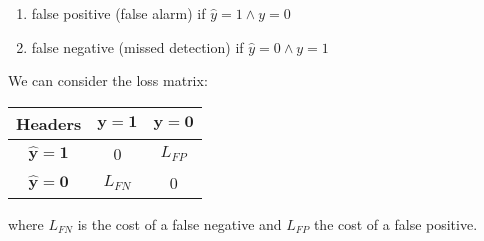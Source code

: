 \begin{itemize}
        \begin{enumerate}
            \item {false positive} (false alarm) if $\hat{y}=1 \wedge y=0$
            \item {false negative} (missed detection) if $\hat{y}=0 \wedge y=1$
        \end{enumerate}
        We can consider the loss matrix:\\
        \begin{tabular}{|*{3}{c|}}
            \hline
            \textbf{Headers} & $\bm{y=1}$ & $\bm{y=0}$\\
            \hline
            $\bm{\hat{y}=1}$ & 0 & $L_{FP}$\\
            \hline
            $\bm{\hat{y}=0}$ & $L_{FN}$ & 0\\
            \hline
        \end{tabular}
        where $L_{FN}$ is the cost of a false negative and $L_{FP}$ the cost of a false
        positive.


\end{itemize}
